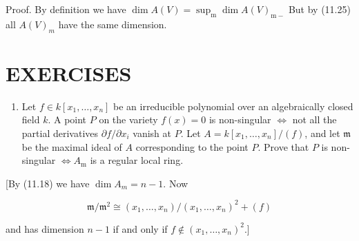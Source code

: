\documentclass{standalone}
\theoremstyle{definition}
\theoremstyle{remark}
\begin{document}
Proof. By definition we have $\operatorname{dim} A(V)=\sup _{\mathrm{m}} \operatorname{dim} A(V)_{\mathrm{m}-}$ But by (11.25) all $A(V)_{m}$ have the same dimension.

\section{EXERCISES}
\begin{enumerate}
  \item Let $f \in k\left[x_{1}, \ldots, x_{n}\right]$ be an irreducible polynomial over an algebraically closed field $k$. A point $P$ on the variety $f(x)=0$ is non-singular $\Leftrightarrow$ not all the partial derivatives $\partial f / \partial x_{i}$ vanish at $P$. Let $A=k\left[x_{1}, \ldots, x_{n}\right] /(f)$, and let $\mathfrak{m}$ be the maximal ideal of $A$ corresponding to the point $P$. Prove that $P$ is non-singular $\Leftrightarrow A_{\mathrm{m}}$ is a regular local ring.
\end{enumerate}

[By (11.18) we have $\operatorname{dim} A_{m}=n-1$. Now

\[
\mathfrak{m} / \mathfrak{m}^{2} \cong\left(x_{1}, \ldots, x_{n}\right) /\left(x_{1}, \ldots, x_{n}\right)^{2}+(f)
\]

and has dimension $n-1$ if and only if $f \notin\left(x_{1}, \ldots, x_{n}\right)^{2}$.]
\end{document}
